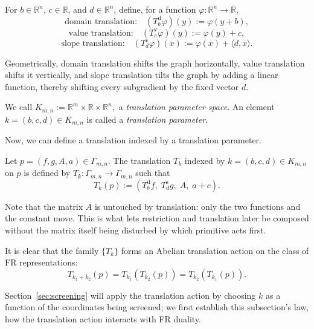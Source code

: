 \begin{definition}
For \(b\in\mathbb R^n\), \(c\in\mathbb R\), and \(d\in\mathbb R^n\),
define, for a function \(\varphi: \mathbb R^n \rightarrow \overline{\mathbb R}\),
\[
\text{domain translation:}
\quad
(T^{\mathrm d}_b \varphi)(y):=\varphi(y+b),
\]
\[
\text{value translation:}
\quad
(T^{\mathrm v}_c \varphi)(y):=\varphi(y)+c,
\]
\[
\text{slope translation:}
\quad
(T^{\mathrm s}_d\varphi)(x):=\varphi(x)+\langle d,x\rangle.
\]
\end{definition}

Geometrically, domain translation shifts the graph horizontally,
value translation shifts it vertically, and slope translation tilts
the graph by adding a linear function, thereby shifting every
subgradient by the fixed vector \(d\).


\begin{definition}
\label{def:translation-parameter}
We call
\(
K_{m,n}:=\mathbb R^m\times\mathbb R\times\mathbb R^n,
\)
a \emph{translation parameter space}.
An element \(k=(b,c,d)\in K_{m,n}\) is called a \emph{translation
parameter}.
\end{definition}

Now, we can define a translation indexed by a translation parameter.

\begin{definition}[Translation]
Let \(p=(f,g,A,a)\in \Gamma_{m, n}\). The translation \(T_k\) indexed by \(k=(b,c,d) \in K_{m, n}\) on \(p\) is defined by \(T_k : \Gamma_{m, n} \rightarrow \Gamma_{m, n} \) such that
\[
T_k(p)
:=
(T^{\mathrm d}_bf,\;
T^{\mathrm s}_dg,\;
A,\;
a+c).
\]
\end{definition}


Note that the matrix \(A\) is untouched by translation: only the two functions
and the constant move. This is what lets restriction and translation
later be composed without the matrix itself being disturbed by which
primitive acts first.

It is clear that the family \(\{T_k\}\) forms an Abelian translation action on the class of FR representations:
\[
T_{k_1+k_2}(p)
=
T_{k_1}(T_{k_2}(p)) = T_{k_2}(T_{k_1}(p)). 
\]
 

Section~\ref{sec:screening} will apply the translation action by
choosing \(k\) as a function of the coordinates being screened; we
first establish this subsection's law, how the translation action
interacts with FR duality.



